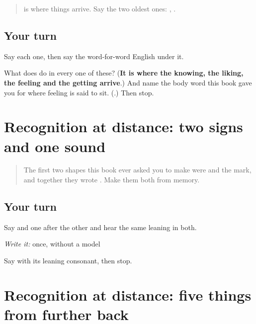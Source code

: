\label{lesson:MR-R25-dative-frame}



\begin{quote}
\textbf{} is where things arrive. Say the two oldest ones: \textbf{  }, \textbf{  }.
\end{quote}

\subsection*{Your turn}
Say each one, then say the word-for-word English under it.

\begin{tcolorbox}[breakable,colback=teal!4,colframe=teal!35!black,title={Before you move on}]
What does \textbf{} do in every one of these? (\textbf{It is where the knowing, the liking, the feeling and the getting arrive}.) And name the body word this book gave you for where feeling is said to sit. (\textbf{}.) Then stop.
\end{tcolorbox}
\section[\texorpdfstring{\mr{ह} / \mr{ो} / \mr{चा} (ha / o / chā)}{ह / ो / चा (ha / o / chā)}]{Recognition at distance: two signs and one sound}

\label{lesson:MR-R25-recognition-script}



\begin{quote}
The first two shapes this book ever asked you to make were \textbf{} and the \textbf{} mark, and together they wrote \textbf{}. Make them both from memory.
\end{quote}

\subsection*{Your turn}
Say \textbf{} and \textbf{} one after the other and hear the same leaning in both.

\begin{tcolorbox}[breakable,colback=teal!4,colframe=teal!35!black,title={Before you move on}]
\emph{Write it:} \textbf{} once, without a model

Say \textbf{} with its leaning consonant, then stop.
\end{tcolorbox}
\section[\texorpdfstring{\mr{आहे} / \mr{मित्र} / \mr{कुटुंब} … (āhe / mitra …)}{आहे / मित्र / कुटुंब … (āhe / mitra …)}]{Recognition at distance: five things from further back}

